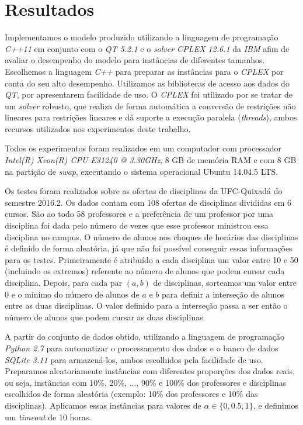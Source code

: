 \chapter{Resultados}
\label{chap:resultados}

Implementamos o modelo produzido utilizando a linguagem de programação \textit{C++11} \cite{c++} em conjunto com o \textit{QT 5.2.1} \cite{qt} e o \textit{solver CPLEX 12.6.1} da \textit{IBM} \cite{ibmcplex} afim de avaliar o desempenho do modelo para instâncias de diferentes tamanhos. Escolhemos a linguagem \textit{C++} para preparar as instâncias para o \textit{CPLEX} por conta do seu alto desempenho. Utilizamos as bibliotecas de acesso aos dados do \textit{QT}, por apresentarem facilidade de uso. O \textit{CPLEX} foi utilizado por se tratar de um \textit{solver} robusto, que realiza de forma automática a conversão de restrições não lineares para restrições lineares e dá suporte a execução paralela (\textit{threads}), ambos recursos utilizados nos experimentos deste trabalho.

Todos os experimentos foram realizados em um computador com processador \textit{Intel(R) Xeon(R) CPU E31240 @ 3.30GHz}, 8 GB de memória RAM e com 8 GB na partição de \textit{swap}, executando o sistema operacional Ubuntu 14.04.5 LTS.

Os testes foram realizados sobre as ofertas de disciplinas da UFC-Quixadá do semestre 2016.2. Os dados contam com 108 ofertas de disciplinas divididas em 6 cursos. São ao todo 58 professores e a preferência de um professor por uma disciplina foi dada pelo número de vezes que esse professor ministrou essa disciplina no campus. O número de alunos nos choques de horários das disciplinas é definido de forma aleatória, já que não foi possível conseguir essas informações para os testes. Primeiramente é atribuído a cada disciplina um valor entre 10 e 50 (incluindo os extremos) referente ao número de alunos que podem cursar cada disciplina. Depois, para cada par $(a, b)$ de disciplinas, sorteamos um valor entre 0 e o mínimo do número de alunos de $a$ e $b$ para definir a interseção de alunos entre as duas disciplinas. O valor definido para a interseção passa a ser então o número de alunos que podem cursar as duas disciplinas.

A partir do conjunto de dados obtido, utilizando a linguagem de programação \textit{Python 2.7} \cite{python} para automatizar o processamento dos dados e o banco de dados \textit{SQLite 3.11} \cite{sqlite} para armazená-los, ambos escolhidos pela facilidade de uso. Preparamos aleatoriamente instâncias com diferentes proporções dos dados reais, ou seja, instâncias com 10\%, 20\%, ..., 90\% e 100\% dos professores e disciplinas escolhidos de forma aleatória (exemplo: 10\% dos professores e 10\% das disciplinas). Aplicamos essas instâncias para valores de $\alpha \in{\{0, 0.5, 1\}}$, e definimos um \textit{timeout} de 10 horas.

